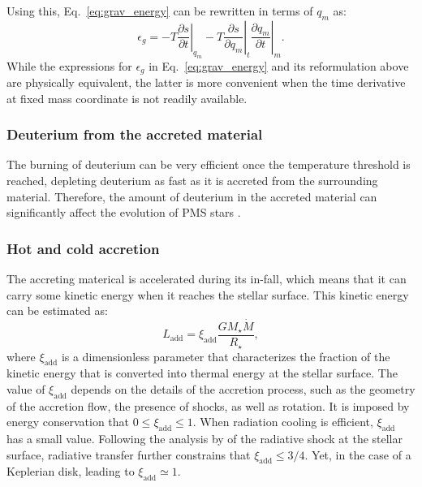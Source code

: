 \documentclass[12pt,a4paper]{article}
\newcommand{\mr}{\mathrm}
\newcommand{\pfird}[2][]{\frac{\partial#1}{\partial#2}}
\begin{document}
Using this, Eq.~\eqref{eq:grav_energy} can be rewritten in terms of $q_m$ as:
\begin{equation}
   \epsilon_g = -T \left.\pfird[s]{t}\right|_{q_m} - T \left.\pfird[s]{q_m}\right|_t\left.\pfird[q_m]{t}\right|_m.
\end{equation}
While the expressions for $\epsilon_g$ in Eq.~\eqref{eq:grav_energy} and its reformulation above are physically equivalent, the latter is more convenient when the time derivative at fixed mass coordinate is not readily available.

\subsubsection{Deuterium from the accreted material}
\label{sec:deuterium_burning}

The burning of deuterium can be very efficient once the temperature threshold is reached, depleting deuterium as fast as it is accreted from the surrounding material. Therefore, the amount of deuterium in the accreted material can significantly affect the evolution of PMS stars \parencite[e.g., ][]{KunitomoEtAl2017}.


\subsubsection{Hot and cold accretion}
\label{sec:hot_cold_accretion}

The accreting materical is accelerated during its in-fall, which means that it can carry some kinetic energy when it reaches the stellar surface. This kinetic energy can be estimated as:
\begin{equation}
  L_\mr{add} = \xi_\mr{add}\frac{GM_\star \dot{M}}{R_\star},
\end{equation}
where $\xi_\mr{add}$ is a dimensionless parameter that characterizes the fraction of the kinetic energy that is converted into thermal energy at the stellar surface. The value of $\xi_\mr{add}$ depends on the details of the accretion process, such as the geometry of the accretion flow, the presence of shocks, as well as rotation. It is imposed by energy conservation that $0 \leq \xi_\mr{add} \leq 1$. When radiation cooling is efficient, $\xi_\mr{add}$ has a small value. Following the analysis by \textcite{StahlerEtAl1980} of the radiative shock at the stellar surface, radiative transfer further constrains that $\xi_\mr{add} \leq 3/4$. Yet, in the case of a Keplerian disk, leading to $\xi_\mr{add} \simeq 1$.
\end{document}
